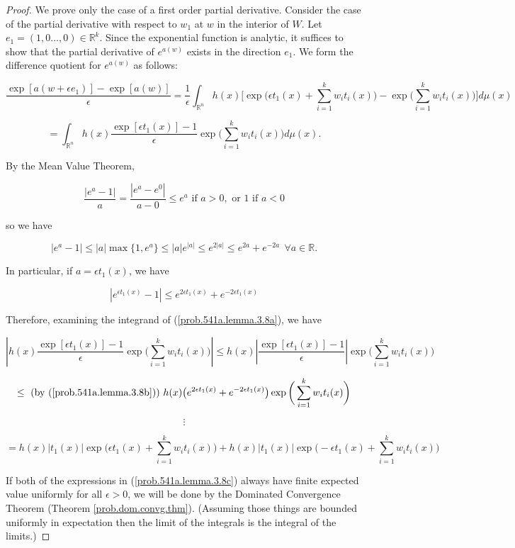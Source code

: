 \begin{proof} We prove only the case of a first order partial derivative. Consider the case of the partial derivative with respect to \(w_1\) at \(w\) in the interior of \(W\). Let \(e_1 = (1, 0 \ldots, 0) \in \mathbb{R}^k\). Since the exponential function is analytic, it suffices to show that the partial derivative of \(e^{a(w)}\) exists in the direction \(e_1\). We form the difference quotient for \(e^{a(w)}\) as follows:

\[
\frac{\exp[a(w+ \epsilon e_1)] - \exp[a(w)] }{\epsilon} = \frac{1}{\epsilon} \int_{\mathbb{R}^n} h(x) \bigg[ \exp \bigg( \epsilon t_1(x) + \sum_{i=1}^k w_i t_i(x) \bigg) - \exp \bigg( \sum_{i=1}^k w_i t_i(x) \bigg)  \bigg] d \mu(x)
\]

\begin{equation}\label{prob.541a.lemma.3.8a}
= \int_{\mathbb{R}^n} h(x) \frac{ \exp[\epsilon t_1(x) ] - 1}{\epsilon}  \exp \bigg( \sum_{i=1}^k w_i t_i(x) \bigg) d \mu(x).
\end{equation}

By the Mean Value Theorem, 

\[
\frac{|e^{a} - 1|}{a} = \frac{|e^a - e^{0}| }{a-0} \leq e^a \text{ if } a > 0, \text{ or } 1 \text{ if } a < 0
\]

so we have

\[
|e^a - 1| \leq |a| \max \{1, e^a \} \leq |a| e^{|a|} \leq e^{2|a|}  \leq e^{2a} + e^{-2a} \ \ \forall a \in \mathbb{R}.
\]

In particular, if \(a =  \epsilon t_1( x)\), we have

\begin{equation}\label{prob.541a.lemma.3.8b}
|e^{ \epsilon t_1( x)} - 1| \leq e^{2  \epsilon t_1( x)} + e^{-2  \epsilon t_1( x)}
\end{equation}

Therefore, examining the integrand of (\ref{prob.541a.lemma.3.8a}), we have

\[
\left|  h(x) \frac{ \exp[\epsilon t_1(x) ] - 1}{\epsilon}  \exp \bigg( \sum_{i=1}^k w_i t_i(x) \bigg) \right|  \leq   h(x) \left|  \frac{ \exp[\epsilon t_1(x) ] - 1}{\epsilon} \right|  \exp \bigg( \sum_{i=1}^k w_i t_i(x) \bigg) 
\]

\[
\leq \text{ (by (\ref{prob.541a.lemma.3.8b})) } h(x) \big( e^{2 \epsilon t_1(x) } + e^{-2 \epsilon t_1(x)} \big)  \exp \bigg( \sum_{i=1}^k w_i t_i(x) \bigg) 
\]

\[
\vdots
\]

\begin{equation}\label{prob.541a.lemma.3.8c}
= h(x) | t_1 (x) | \exp\bigg( \epsilon t_1(x) + \sum_{i=1}^k w_i t_i (x) \bigg) + h(x) |t_1(x)| \exp \bigg( - \epsilon t_1(x) + \sum_{i=1}^k w_i t_i(x) \bigg) 
\end{equation}

If both of the expressions in (\ref{prob.541a.lemma.3.8c}) always have finite expected value uniformly for all \(\epsilon > 0\), we will be done by the Dominated Convergence Theorem (Theorem \ref{prob.dom.convg.thm}). (Assuming those things are bounded uniformly in expectation then the limit of the integrals is the integral of the limits.) 

\end{proof}

